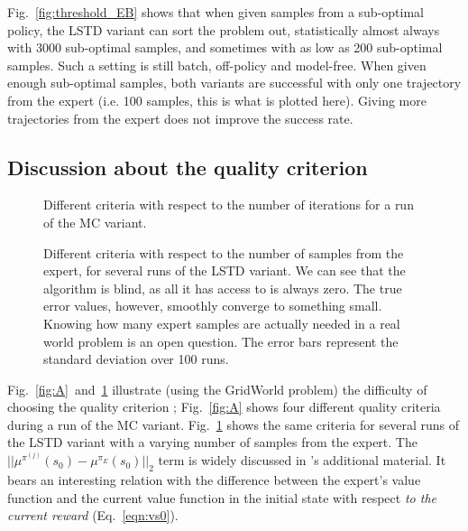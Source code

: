 \documentclass{llncs}
\begin{document}
Fig.~\ref{fig:threshold_EB} shows that when given samples from a sub-optimal policy, the LSTD variant can sort the problem out, statistically almost always with 3000 sub-optimal samples, and sometimes with as low as 200 sub-optimal samples. Such a setting is still batch, off-policy and model-free. When given enough sub-optimal samples, both variants are successful with only one trajectory from the expert (i.e. 100 samples, this is what is plotted here). Giving more trajectories from the expert does not improve the success rate.
\subsection{Discussion about the quality criterion}
\label{ssec:quality}
\begin{figure}
\begin{minipage}[t]{.4\linewidth}
    \begin{center}
      \resizebox{\columnwidth}{!}{}
      \caption{Different criteria with respect to the number of iterations for a run of the MC variant.}
      \label{fig:A}
    \end{center}
\end{minipage}
\hfill
\begin{minipage}[t]{.4\linewidth}
    \begin{center}
\resizebox{\columnwidth}{!}{}
\caption{Different criteria with respect to the number of samples from the expert, for several runs of the LSTD variant. We can see that the algorithm is blind, as all it has access to is always zero. The true error values, however, smoothly converge to something small. Knowing how many expert samples are actually needed in a real world problem is an open question. The error bars represent the standard deviation over 100 runs.}
\label{fig:B}
    \end{center}
\end{minipage}
\end{figure}

Fig.~\ref{fig:A}~and~\ref{fig:B} illustrate (using the GridWorld problem) the difficulty of choosing the quality criterion ; Fig.~\ref{fig:A} shows four different quality criteria during a run of the MC variant. Fig.~\ref{fig:B} shows the same criteria for several runs of the LSTD variant with a varying number of samples from the expert. The $||\mu^{\pi^{(j)}}(s_0) - \mu^{\pi_E}(s_0)||_2$ term is widely discussed in \citep{abbeel2004apprenticeship}'s additional material. It bears an interesting relation with the difference between the expert's value function and the current value function in the initial state with respect \emph{to the current reward} (Eq.~\ref{eqn:vs0}).\\
\end{document}
